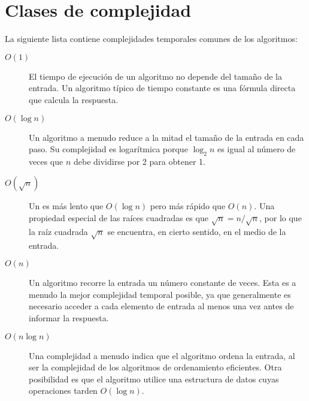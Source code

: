 \section{Clases de complejidad}


La siguiente lista contiene complejidades temporales comunes
de los algoritmos:

\begin{description}
    \item[$O(1)$]
          El tiempo de ejecución de un algoritmo 
          no depende del tamaño de la entrada.
          Un algoritmo típico de tiempo constante es una fórmula directa
          que calcula la respuesta.

    \item[$O(\log n)$]
          Un algoritmo  a menudo reduce a la mitad
          el tamaño de la entrada en cada paso.
          Su complejidad es logarítmica porque
          $\log_2 n$ es igual al número de veces
          que $n$ debe dividirse por 2 para obtener 1.

    \item[$O(\sqrt n)$]
          Un  es más lento que
          $O(\log n)$ pero más rápido que $O(n)$.
          Una propiedad especial de las raíces cuadradas es que
          $\sqrt n = n/\sqrt n$, por lo que la raíz cuadrada $\sqrt n$ se encuentra,
          en cierto sentido, en el medio de la entrada.

    \item[$O(n)$]
          Un algoritmo  recorre la entrada
          un número constante de veces.
          Esta es a menudo la mejor complejidad temporal posible,
          ya que generalmente es necesario acceder a cada
          elemento de entrada al menos una vez antes de
          informar la respuesta.

    \item[$O(n \log n)$]
          Una complejidad  a menudo indica que el
          algoritmo ordena la entrada, al ser la complejidad de
          los algoritmos de ordenamiento
          eficientes. Otra posibilidad es que el algoritmo
          utilice una estructura de datos cuyas operaciones
          tarden $O(\log n)$.


\end{description}
